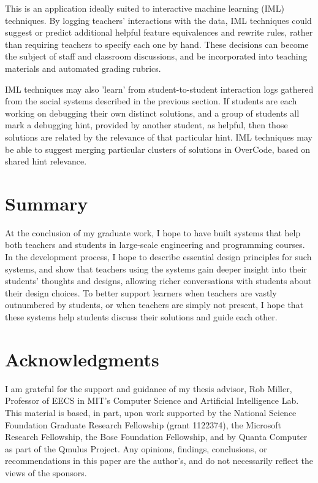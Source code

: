 \documentclass{sigchi}
\begin{document}
This is an application ideally suited to interactive machine learning (IML) techniques. By logging teachers' interactions with the data, IML techniques could suggest or predict additional helpful feature equivalences and rewrite rules, rather than requiring teachers to specify each one by hand. These decisions can become the subject of staff and classroom discussions, and be incorporated into teaching materials and automated grading rubrics.

IML techniques may also 'learn' from student-to-student interaction logs gathered from the social systems described in the previous section. If students are each working on debugging their own distinct solutions, and a group of students all mark a debugging hint, provided by another student, as helpful, then those solutions are related by the relevance of that particular hint. IML techniques may be able to suggest merging particular clusters of solutions in OverCode, based on shared hint relevance.

\section{Summary}
At the conclusion of my graduate work, I hope to have built systems that help both teachers and students in large-scale engineering and programming courses. In the development process, I hope to describe essential design principles for such systems, and show that teachers using the systems gain deeper insight into their students' thoughts and designs, allowing richer conversations with students about their design choices. To better support learners when teachers are vastly outnumbered by students, or when teachers are simply not present, I hope that these systems help students discuss their solutions and guide each other.

\section{Acknowledgments}

I am grateful for the support and guidance of my thesis advisor, Rob Miller, Professor of EECS in MIT's Computer Science and Artificial Intelligence Lab. This material is based, in part, upon work supported by the National Science Foundation Graduate Research Fellowship (grant 1122374), the Microsoft Research Fellowship, the Bose Foundation Fellowship, and by Quanta Computer as part of the Qmulus Project. Any opinions, findings, conclusions, or recommendations in this paper are the author's, and do not necessarily reflect the views of the sponsors.
\end{document}
